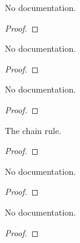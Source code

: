 \begin{theorem}\label{HasGradientWithinAt.comp
}
        \leanok
                No documentation.
    \end{theorem}

\begin{proof}
    \leanok
\end{proof}

\begin{theorem}\label{HasGradientAt.comp_hasGradientWithinAt
}
        \leanok
                No documentation.
    \end{theorem}

\begin{proof}
    \leanok
\end{proof}

\begin{theorem}\label{HasGradientWithinAt.comp_of_mem
}
        \leanok
                No documentation.
    \end{theorem}

\begin{proof}
    \leanok
\end{proof}

\begin{theorem}\label{HasGradientAt.comp}
        \leanok
                The chain rule.
    \end{theorem}

\begin{proof}
    \leanok
\end{proof}

\begin{theorem}\label{gradient.comp}
        \leanok
                No documentation.
    \end{theorem}

\begin{proof}
    \leanok
\end{proof}

\begin{theorem}\label{HasGradientAtFilter.const_smul}
        \leanok
                No documentation.
    \end{theorem}

\begin{proof}
    \leanok
\end{proof}

